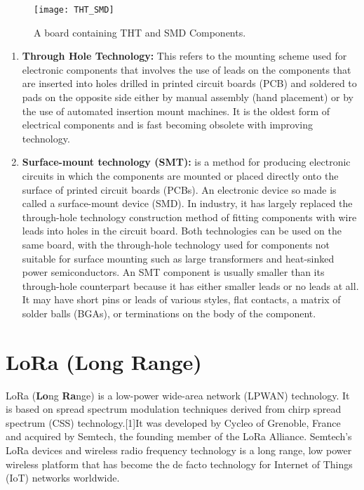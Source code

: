 \begin{figure}[p]

\texttt{[image: THT\_SMD]}
\centering
\caption{A board containing THT and SMD Components.}
\centering
\label{fig:THT_SMD}


\end{figure}
\begin{enumerate}
\item \textbf{Through Hole Technology:} This refers to the mounting scheme used for electronic components that involves the use of leads on the components that are inserted into holes drilled in printed circuit boards (PCB) and soldered to pads on the opposite side either by manual assembly (hand placement) or by the use of automated insertion mount machines. It is the oldest form of electrical components and is fast becoming obsolete with improving technology.
\item \textbf{Surface-mount technology (SMT):} is a method for producing electronic circuits in which the components are mounted or placed directly onto the surface of printed circuit boards (PCBs). An electronic device so made is called a surface-mount device (SMD). In industry, it has largely replaced the through-hole technology construction method of fitting components with wire leads into holes in the circuit board. Both technologies can be used on the same board, with the through-hole technology used for components not suitable for surface mounting such as large transformers and heat-sinked power semiconductors. An SMT component is usually smaller than its through-hole counterpart because it has either smaller leads or no leads at all. It may have short pins or leads of various styles, flat contacts, a matrix of solder balls (BGAs), or terminations on the body of the component. 
\end{enumerate}


\section{LoRa (Long Range)}
LoRa (\textbf{Lo}ng \textbf{Ra}nge) is a low-power wide-area network (LPWAN) technology. It is based on spread spectrum modulation techniques derived from chirp spread spectrum (CSS) technology.[1]It was developed by Cycleo of Grenoble, France and acquired by Semtech, the founding member of the LoRa Alliance.
Semtech’s LoRa devices and wireless radio frequency technology is a long range, low power wireless platform that has become the de facto technology for Internet of Things (IoT) networks worldwide.

